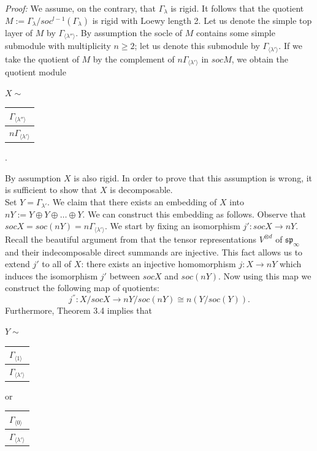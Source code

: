 \emph{Proof: } We assume, on the contrary, that
$\Gamma_{\lambda}$ is rigid. It follows that the quotient $M:=\Gamma_{\lambda}/soc^{l-1}(\Gamma_{\lambda})$ is rigid with Loewy length 2. Let us denote the simple top layer of $M$ by $\Gamma_{\langle\lambda''\rangle}$. By assumption the socle of $M$ contains some simple submodule with multiplicity $n\geq 2$; let us denote this submodule by $\Gamma_{\langle \lambda'\rangle}$. If we take the quotient of $M$ by the complement of $n\Gamma_{\langle \lambda' \rangle}$ in $socM$, we obtain the quotient module 
\begin{center}
$X\sim$ 
\begin{tabular}{|l|} 
\hline $\Gamma_{ \langle\lambda''\rangle}$\\ \hline  $n\Gamma_{\langle\lambda'\rangle}$
\\ \hline
\end{tabular}.
\end{center}
By assumption $X$ is also rigid. In order to prove that this assumption is wrong, it is sufficient to show that $X$ is decomposable. 
\\Set $Y=\Gamma_{ \lambda'}$. We claim that there exists an embedding of $X$ into $nY:=Y\oplus Y\oplus \dots \oplus Y$. We can construct this embedding as follows. Observe that $socX=soc(nY)=n\Gamma_{\langle\lambda'\rangle}$. We start by fixing an isomorphism $j':socX\rightarrow nY$. Recall the beautiful argument from \cite{cohen} that the tensor representations $V^{\otimes d}$ of $\mathfrak{sp}_{\infty}$ and their indecomposable direct summands are injective. This fact allows us to extend $j'$ to all of $X$: there exists an injective homomorphism $j:X\rightarrow nY$ which induces the isomorphism $j'$ between $socX$ and $soc(nY)$. Now using this map we construct the following map of quotients:
$$j^{''}:X/socX\rightarrow nY/soc(nY)\cong n(Y/soc(Y)).$$
Furthermore, Theorem 3.4 implies that
\begin{center}
$Y\sim$ 
\begin{tabular}{|l|} 
\hline $\Gamma_{ \langle 1 \rangle}$\\ \hline  $\Gamma_{\langle\lambda'\rangle}$
\\ \hline
\end{tabular} \hspace{3mm} or \hspace{3mm}   
\begin{tabular}{|l|} 
\hline $\Gamma_{ \langle 0 \rangle}$\\ \hline  $\Gamma_{\langle\lambda'\rangle}$
\\ \hline
\end{tabular}
\end{center}
